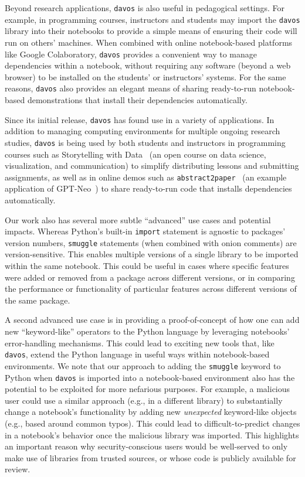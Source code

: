 \documentclass[preprint,12pt,a4paper]{elsarticle}
\begin{document}
Beyond research applications, \texttt{davos} is also useful in
pedagogical settings. For example, in programming courses,
instructors and students may import the \texttt{davos} library into
their notebooks to provide a simple means of ensuring their code will
run on others' machines. When combined with online notebook-based
platforms like Google Colaboratory, \texttt{davos} provides a
convenient way to manage dependencies within a notebook, without
requiring any software (beyond a web browser) to be installed on the
students' or instructors' systems. For the same reasons,
\texttt{davos} also provides an elegant means of sharing ready-to-run
notebook-based demonstrations that install their dependencies
automatically.

Since its initial release, \texttt{davos} has found use in a variety
of applications. In addition to managing computing environments
for multiple ongoing research studies, \texttt{davos} is being used by
both students and instructors in programming courses such as
Storytelling with Data~\cite{Mann21b} (an open course on data science,
visualization, and communication) to simplify distributing lessons and
submitting assignments, as well as in online demos such as
\texttt{abstract2paper}~\cite{Mann21a} (an example application of
GPT-Neo~\cite{GaoEtal20, BlacEtal21}) to share ready-to-run code that
installs dependencies automatically.

Our work also has several more subtle ``advanced'' use cases and
potential impacts. Whereas Python's built-in \texttt{import}
statement is agnostic to packages' version numbers, \texttt{smuggle}
statements (when combined with onion comments) are version-sensitive.
This enables multiple versions of a single library to be
imported within the same notebook. This could be useful in cases
where specific features were added or removed from a package across
different versions, or in comparing the performance or functionality
of particular features across different versions of the same package.

A second advanced use case is in providing a proof-of-concept of how
one can add new ``keyword-like'' operators to the Python language by
leveraging notebooks' error-handling mechanisms. This could lead to
exciting new tools that, like \texttt{davos}, extend the Python
language in useful ways within notebook-based environments. We note that
our approach to adding the \texttt{smuggle} keyword to Python when
\texttt{davos} is imported into a notebook-based environment also has
the potential to be exploited for more nefarious purposes. For
example, a malicious user could use a similar approach (e.g., in a
different library) to substantially change a notebook's functionality
by adding new \textit{unexpected} keyword-like objects (e.g., based
around common typos). This could lead to difficult-to-predict changes
in a notebook's behavior once the malicious library was imported.
This highlights an important reason why security-conscious users would
be well-served to only make use of libraries from trusted sources, or
whose code is publicly available for review.
\end{document}
